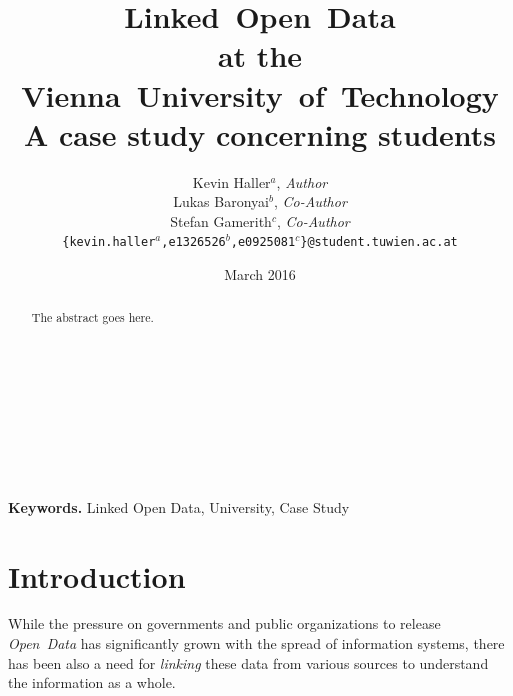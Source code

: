 \documentclass{article}
\begin{document}
\title{Linked~Open~Data\\
	   at the\\
	   Vienna~University~of~Technology\\
	   \large A case study concerning students}

\author{Kevin Haller$^a$, \textit{Author}\\
		Lukas Baronyai$^b$, \textit{Co-Author}\\
		Stefan Gamerith$^c$, \textit{Co-Author}\\
	\texttt{\{kevin.haller$^a$,e1326526$^b$,e0925081$^c$\}@student.tuwien.ac.at}}
\date{March 2016} 

\maketitle

\begin{abstract}
The abstract goes here.\\
 \\
 \\
 \\
 \\
 \\
 \\
 \\
\end{abstract}

\smallskip
\noindent \textbf{Keywords.} Linked Open Data, University, Case Study

\newpage


\tableofcontents

\newpage



\section{Introduction}
\label{introduction}
While the pressure on governments and public organizations to release \textit{Open~Data} has significantly grown with the spread of information systems, there has been also a need for \textit{linking} these data from various sources to understand the information as a whole.
\end{document}
